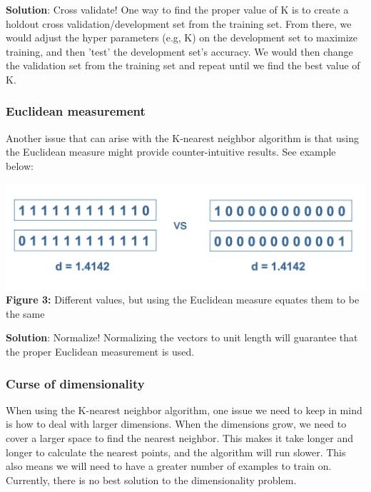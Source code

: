 \documentclass{article}
\begin{document}
\textbf{Solution}: Cross validate!\newline
One way to find the proper value of K is to create a holdout cross validation/development set from the training set. From there, we would adjust the hyper parameters (e.g, K) on the development set to maximize training, and then 'test' the development set's accuracy. We would then change the validation set from the training set and repeat until we find the best value of K.

\subsubsection{Euclidean measurement}

Another issue that can arise with the K-nearest neighbor algorithm is that using the Euclidean measure might provide counter-intuitive results. See example below:

\begin{center}
	\includegraphics[scale=0.35]{EuclideanIssue.png}\\
    \textbf{Figure 3:} Different values, but using the Euclidean measure equates them to be the same\\
\end{center}

\textbf{Solution}: Normalize!\newline
Normalizing the vectors to unit length will guarantee that the proper Euclidean measurement is used.


\subsubsection{Curse of dimensionality}

When using the K-nearest neighbor algorithm, one issue we need to keep in mind is how to deal with larger dimensions. When the dimensions grow, we need to cover a larger space to find the nearest neighbor. This makes it take longer and longer to calculate the nearest points, and the algorithm will run slower. This also means we will need to have a greater number of examples to train on. Currently, there is no best solution to the dimensionality problem. \newline
\end{document}
